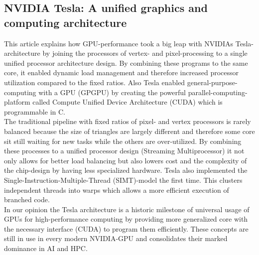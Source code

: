 \subsection{NVIDIA Tesla: A unified graphics and computing architecture}
This article explains how GPU-performance took a big leap with NVIDIAs Tesla-architecture by joining the processors of vertex- and pixel-processing to a single unified processor architecture design. By combining these programs to the same core, it enabled dynamic load management and therefore increased processor utilization compared to the fixed ratios. Also Tesla enabled general-purpose-computing with a GPU (GPGPU) by creating the powerful parallel-computing-platform called Compute Unified Device Architecture (CUDA) which is programmable in C.\\
The traditional pipeline with fixed ratios of pixel- and vertex processors is rarely balanced because the size of triangles are largely different and therefore some core sit still waiting for new tasks while the others are over-utilized. By combining these processes to a unified processor design (Streaming Multiprocessor) it not only allows for better load balancing but also lowers cost and the complexity of the chip-design by having less specialized hardware. Tesla also implemented the Single-Instruction-Multiple-Thread (SIMT)-model the first time. This clusters independent threads into warps which allows a more efficient execution of branched code.\\
In our opinion the Tesla architecture is a historic milestone of universal usage of GPUs for high-performance computing by providing more generalized core with the necessary interface (CUDA) to program them efficiently. These concepts are still in use in every modern NVIDIA-GPU and consolidates their marked dominance in AI and HPC.